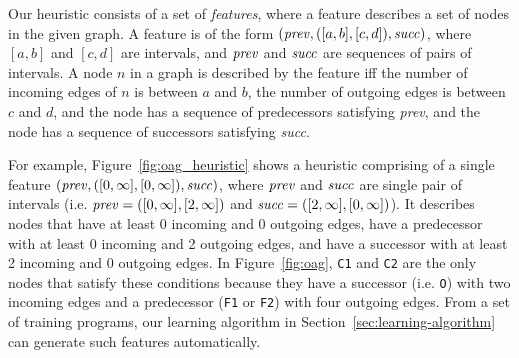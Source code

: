
Our heuristic consists of a set of {\em features}, where a feature describes a set of nodes in the given graph.
A feature is of the form $({\it prev}, ([a,b], [c,d]),{\it succ})$, where $[a,b]$ and $[c,d]$ are intervals, and ${\it prev}$ and ${\it succ}$ are sequences of pairs of intervals. A node $n$ in a graph is described by the feature iff the number of incoming edges of $n$ is between $a$ and $b$, the number of outgoing edges is between $c$ and $d$, and the node has a sequence of predecessors satisfying {\it prev}, and the node has a sequence of successors satisfying {\it succ}.

For example, Figure~\ref{fig:oag_heuristic} shows a heuristic comprising of a single feature $({\it prev} , ([0,\infty],[0,\infty]), {\it succ})$, where ${\it prev}$ and ${\it succ}$ are single pair of intervals (i.e. ${\it prev} = ([0,\infty],[2,\infty])$ and ${\it succ} = ([2,\infty], [0,\infty])$). It describes nodes that have at least 0 incoming and 0 outgoing edges, have a predecessor with at least 0 incoming and 2 outgoing edges, and have a successor with at least 2 incoming and 0 outgoing edges.
In Figure~\ref{fig:oag}, {\tt C1} and {\tt C2} are the only nodes that satisfy these conditions because they have a successor (i.e. {\tt O}) with two incoming edges and a predecessor ({\tt F1} or {\tt F2}) with four outgoing edges.
From a set of training programs, our learning algorithm in Section~\ref{sec:learning-algorithm} can generate such features automatically.



%
%
%


